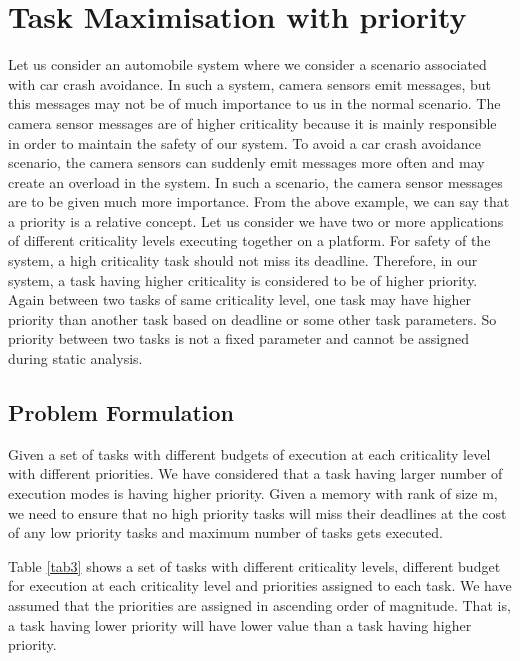 \section{Task Maximisation with priority}\label{tmwp}
\noindent
Let us consider an automobile system where we consider a scenario associated with car crash avoidance. In such a system,
camera sensors emit messages, but this messages may not be of much importance to us in the normal scenario. The camera 
sensor messages are of higher criticality because it is mainly responsible in order to maintain the safety of our system.
To avoid a car crash avoidance scenario, the camera sensors can suddenly emit messages more often and may create an overload 
in the system. In such a scenario, the camera sensor messages are to be given much more importance.
\newline
\newline
From the above example, we can say that a priority is a relative concept. Let us consider we have two or more applications 
of different criticality levels executing together on a platform. For safety of the system, a high criticality task should 
not miss its deadline. Therefore, in our system, a task having higher criticality is considered to be of higher priority.
Again between two tasks of same criticality level, one task may have higher priority than another task based on deadline or 
some other task parameters. So priority between two tasks is not a fixed parameter and cannot be assigned during static 
analysis.
\subsection{Problem Formulation}\label{pftp}
\begin{problem}
 Given a set of tasks with different budgets of execution at each criticality level with different priorities. We have 
 considered that a task having larger number of execution modes is having higher priority. Given a memory with rank of size 
 m, we need to ensure that no high priority tasks will miss their deadlines at the cost of any low priority tasks and maximum
 number of tasks gets executed.
\end{problem}
Table \ref{tab3} shows a set of tasks with different criticality levels, different budget for execution at each 
criticality level and priorities assigned to each task. We have assumed that the priorities are assigned in ascending order of 
magnitude. That is, a task having lower priority will have lower value than a task having higher priority.


